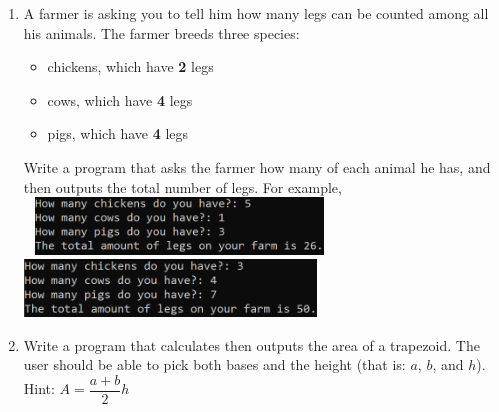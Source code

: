 \documentclass{article}
\begin{document}
\begin{enumerate}
	\item
		A farmer is asking you to tell him how many legs can be counted among all his animals. 
		The farmer breeds three species:
		\begin{itemize}
			\item chickens, which have \textbf{2} legs
			\item cows, which have \textbf{4} legs
			\item pigs, which have \textbf{4} legs
		\end{itemize}
		Write a program that asks the farmer how many of each animal he has, and then outputs the
		total number of legs.  		
		For example, \\ \ \hfill
		\includegraphics[height = 0.6in]{./imgs/animalLegs_ex1.PNG} \hfill
		\includegraphics[height = 0.6in]{./imgs/animalLegs_ex2.PNG} \hfill \
	
	
	
	

	\item 
		Write a program that calculates then outputs the area of a trapezoid.  
		The user should be able to pick both bases and the height (that is: $a$, $b$, and $h$).\\
		Hint: $A = \dfrac{a+b}{2}h$
		
		\vspace*{-3em}
		\begin{flushright}
		\end{flushright}



\end{enumerate}
\end{document}

